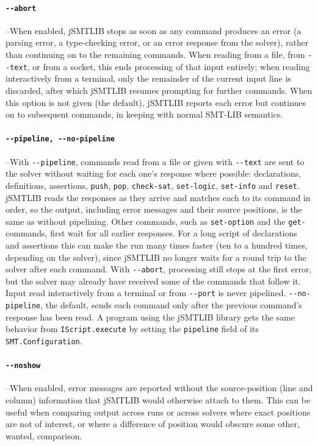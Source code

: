 \documentclass[12pt,oneside]{report}
\begin{document}
\paragraph{\tt -{}-abort}\label{opt:abort} --When enabled, jSMTLIB stops as soon as any command produces an error (a parsing error, a type-checking error, or an error response from the solver), rather than continuing on to the remaining commands. When reading from a file, from {\tt -{}-text}, or from a socket, this ends processing of that input entirely; when reading interactively from a terminal, only the remainder of the current input line is discarded, after which jSMTLIB resumes prompting for further commands. When this option is not given (the default), jSMTLIB reports each error but continues on to subsequent commands, in keeping with normal SMT-LIB semantics.

\paragraph{\tt -{}-pipeline, -{}-no-pipeline}\label{opt:pipeline} --With {\tt -{}-pipeline}, commands read from a file or given with {\tt -{}-text} are sent to the solver without waiting for each one's response where possible: declarations, definitions, assertions, {\tt push}, {\tt pop}, {\tt check-sat}, {\tt set-logic}, {\tt set-info} and {\tt reset}. jSMTLIB reads the responses as they arrive and matches each to its command in order, so the output, including error messages and their source positions, is the same as without pipelining. Other commands, such as {\tt set-option} and the {\tt get-} commands, first wait for all earlier responses. For a long script of declarations and assertions this can make the run many times faster (ten to a hundred times, depending on the solver), since jSMTLIB no longer waits for a round trip to the solver after each command. With {\tt -{}-abort}, processing still stops at the first error, but the solver may already have received some of the commands that follow it. Input read interactively from a terminal or from {\tt -{}-port} is never pipelined. {\tt -{}-no-pipeline}, the default, sends each command only after the previous command's response has been read. A program using the jSMTLIB library gets the same behavior from {\tt IScript.execute} by setting the {\tt pipeline} field of its {\tt SMT.Configuration}.

\paragraph{\tt -{}-noshow}\label{opt:noshow} --When enabled, error messages are reported without the source-position (line and column) information that jSMTLIB would otherwise attach to them. This can be useful when comparing output across runs or across solvers where exact positions are not of interest, or where a difference of position would obscure some other, wanted, comparison.
\end{document}
